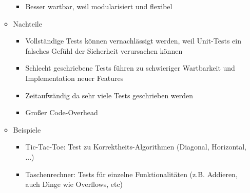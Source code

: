 \documentclass[a4paper, 11pt]{article}
\begin{document}
\begin{itemize}
\begin{itemize}
\begin{itemize}
			            \item Besser wartbar, weil modularisiert und flexibel
		            \end{itemize}
		      \item Nachteile
		            \begin{itemize}
			            \item Vollständige Tests können vernachlässigt werden, weil Unit-Tests ein falsches Gefühl der Sicherheit verursachen können
			            \item Schlecht geschriebene Tests führen zu schwieriger Wartbarkeit und Implementation neuer Features
			            \item Zeitaufwändig da sehr viele Tests geschrieben werden
			            \item Großer Code-Overhead
		            \end{itemize}
		      \item Beispiele
		            \begin{itemize}
			            \item Tic-Tac-Toe: Test zu Korrektheits-Algorithmen (Diagonal, Horizontal, ...)
			            \item Taschenrechner: Tests für einzelne Funktionalitäten (z.B. Addieren, auch Dinge wie Overflows, etc)
		            \end{itemize}
	      \end{itemize}
\end{itemize}
\end{document}
